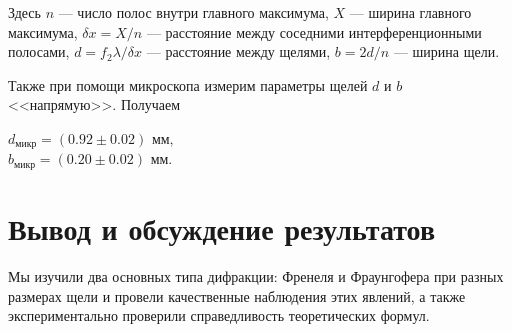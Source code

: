 \documentclass[a4paper,12pt]{article}
\begin{document}
Здесь $n$ --- число полос внутри главного максимума, $X$ --- ширина главного максимума, $\delta x = X/n$ --- расстояние между соседними интерференционными полосами, $d = f_2 \lambda/\delta x$ --- расстояние между щелями, $b = 2d/n$ --- ширина щели.

Также при помощи микроскопа измерим параметры щелей $ d $ и $ b $ <<напрямую>>. Получаем\begin{center}
$d_\text{микр} = (0.92 \pm 0.02) \text{ мм},$\\
$b_\text{микр} = (0.20 \pm 0.02) \text{ мм}.$ 
\end{center}




\section{Вывод и обсуждение результатов}
Мы изучили два основных типа дифракции: Френеля и Фраунгофера при разных размерах щели и провели качественные наблюдения этих явлений, а также экспериментально проверили справедливость теоретических формул.
\end{document}
